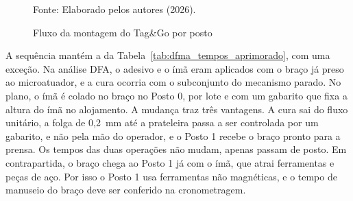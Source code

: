 \begin{figure}[htbp]
\centering
\caption{Fluxo da montagem do Tag\&Go por posto}
\label{fig:plano_fluxo}
\begin{center}
Fonte: Elaborado pelos autores (2026).
\end{center}
\end{figure}

A sequência mantém a da Tabela~\ref{tab:dfma_tempos_aprimorado}, com uma exceção. Na análise DFA, o adesivo e o ímã eram aplicados com o braço já preso ao microatuador, e a cura ocorria com o subconjunto do mecanismo parado. No plano, o ímã é colado no braço no Posto 0, por lote e com um gabarito que fixa a altura do ímã no alojamento. A mudança traz três vantagens. A cura sai do fluxo unitário, a folga de 0,2~mm até a prateleira passa a ser controlada por um gabarito, e não pela mão do operador, e o Posto 1 recebe o braço pronto para a prensa. Os tempos das duas operações não mudam, apenas passam de posto. Em contrapartida, o braço chega ao Posto 1 já com o ímã, que atrai ferramentas e peças de aço. Por isso o Posto 1 usa ferramentas não magnéticas, e o tempo de manuseio do braço deve ser conferido na cronometragem.

